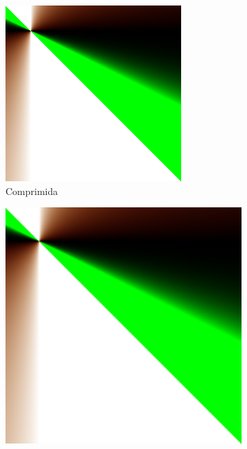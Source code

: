 \documentclass{article}
\begin{document}
\begin{figure}[ht]
\begin{subfigure}{0.23\textwidth}
    \includegraphics[width=\textwidth]{polinomial/h-1/compressed.png}
    \caption{Comprimida}
  \end{subfigure}%
  \hfill
  \begin{subfigure}{0.23\textwidth}
    \centering
    \includegraphics[width=\textwidth]{polinomial/h-1/decompressed-bilinear.png}

\end{subfigure}
\end{figure}
\end{document}
